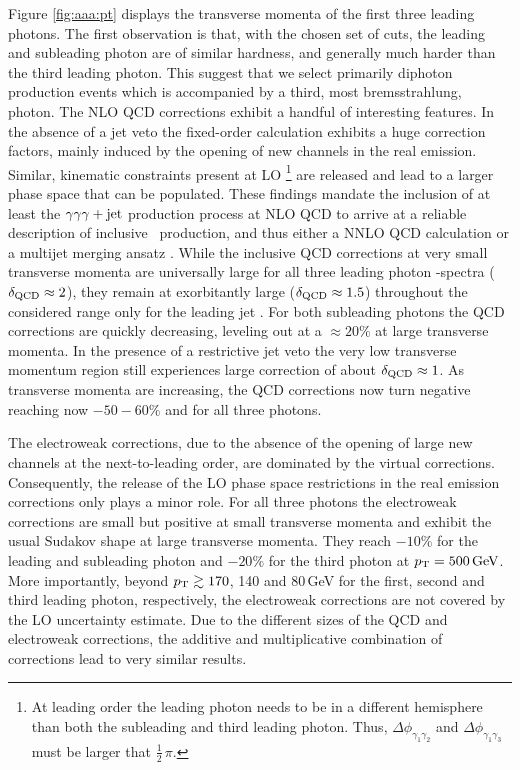 Figure \ref{fig:aaa:pt} displays the transverse momenta of the 
first three leading photons. 
The first observation is that, with the chosen set of cuts, 
the leading and subleading photon are of similar hardness, 
and generally much harder than the third leading photon. 
This suggest that we select primarily diphoton production events 
which is accompanied by a third, most bremsstrahlung, photon. 
The NLO QCD corrections exhibit a handful of interesting features. 
In the absence of a jet veto the fixed-order calculation 
exhibits a huge correction factors, mainly induced by the 
opening of new channels in the real emission. 
Similar, kinematic constraints present at LO \footnote{
  At leading order the leading photon needs to be in a different 
  hemisphere than both the subleading and third leading photon. 
  Thus, $\Delta\phi_{\gamma_1\gamma_2}$ and $\Delta\phi_{\gamma_1\gamma_3}$ 
  must be larger that $\tfrac{1}{2}\,\pi$.
} are released and 
lead to a larger phase space that can be populated. 
These findings mandate the inclusion of at least the $\gamma\gamma\gamma+\text{jet}$ 
production process at NLO QCD to arrive at a reliable description 
of inclusive \aaa\ production, and thus either a NNLO QCD calculation 
or a multijet merging ansatz \cite{Hoeche:2012yf,Kallweit:2015dum}. 
While the inclusive QCD corrections at very small transverse momenta 
are universally large for all three leading photon \pT-spectra 
($\delta_\text{QCD}\approx 2$), they remain at exorbitantly large 
($\delta_\text{QCD}\approx 1.5$) throughout the considered range 
only for the leading jet \pT. 
For both subleading photons the QCD corrections are quickly 
decreasing, leveling out at a $\approx 20\%$ at large transverse 
momenta.
In the presence of a restrictive jet veto the very low transverse 
momentum region still experiences large correction of about 
$\delta_\text{QCD}\approx 1$. 
As transverse momenta are increasing, the QCD corrections now turn 
negative reaching now $-50-60\%$ and for all three photons. 

The electroweak corrections, due to the absence of the opening 
of large new channels at the next-to-leading order, are dominated 
by the virtual corrections. 
Consequently, the release of the LO phase space restrictions 
in the real emission corrections only plays a minor role.
For all three photons the electroweak corrections are small but 
positive at small transverse momenta and exhibit the usual 
Sudakov shape at large transverse momenta.
They reach $-10\%$ for the leading and subleading photon and 
$-20\%$ for the third photon at $p_\text{T}=500\,\text{GeV}$. 
More importantly, beyond $p_\text{T}\gtrsim 170$, 140 and 80\,GeV 
for the first, second and third leading photon, respectively, 
the electroweak corrections are not covered by the LO 
uncertainty estimate.
Due to the different sizes of the QCD and electroweak 
corrections, the additive and multiplicative combination 
of corrections lead to very similar results.

